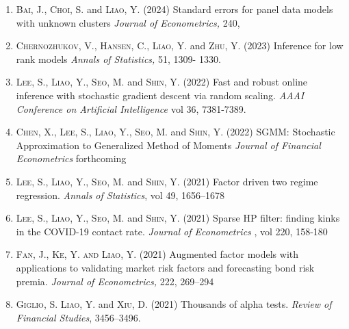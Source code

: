 \documentclass[11pt]{article}
\begin{document}
\begin{enumerate}
 

\item   \textsc{Bai, J.},   \textsc{Choi, S.} and \textsc{\textsc{Liao, Y.}}  (2024) Standard errors for panel data models with unknown clusters    {\it  { Journal of Econometrics},    } 240, 

	
\item  \textsc{Chernozhukov, V., Hansen, C., Liao, Y.}  and  \textsc{\textsc{Zhu, Y.}} (2023) Inference for low rank models {\it  { Annals of Statistics},  }    {51}, 1309- 1330.


 
\item  \textsc{Lee, S., }   \textsc{\textsc{Liao, Y.}}, \textsc{Seo, M.} and \textsc{Shin, Y.} (2022)  Fast and robust online inference with stochastic gradient descent via random scaling.  {\it  {AAAI Conference on Artificial Intelligence    }   } vol 36,  7381-7389. 




\item  \textsc{Chen, X., }  \textsc{Lee, S., }   \textsc{\textsc{Liao, Y.}}, \textsc{Seo, M.} and \textsc{Shin, Y.} (2022)  SGMM: Stochastic Approximation to Generalized Method of Moments  {\it Journal of Financial Econometrics   } forthcoming


 
      
   
  \item  \textsc{Lee, S., }   \textsc{\textsc{Liao, Y.}}, \textsc{Seo, M.} and \textsc{Shin, Y.} (2021)  	Factor driven two regime regression. {\it  Annals of Statistics}, vol 49, 1656--1678



 
  \item  \textsc{Lee, S., }   \textsc{\textsc{Liao, Y.}}, \textsc{Seo, M.} and \textsc{Shin, Y.} (2021)  Sparse HP filter: finding kinks in the COVID-19 contact rate.     {\it  { Journal of Econometrics}   }, vol 220,  158-180

 
 
 
  \item    \textsc{Fan, J.,   \textsc{Ke, Y.} and \textsc{Liao, Y.}}  (2021)  Augmented factor models with applications to validating market risk factors and forecasting bond risk premia.  {\it  { Journal of Econometrics},    } 222, 269--294

    \item  \textsc{Giglio, S.}   \textsc{\textsc{Liao, Y.}} and   \textsc{Xiu, D.} (2021)  	Thousands of alpha tests. {\it   Review of Financial Studies}, 3456--3496.
 

\end{enumerate}
\end{document}

